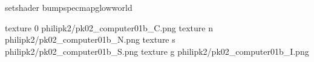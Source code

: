 setshader bumpspecmapglowworld


texture 0 philipk2/pk02_computer01b_C.png
texture n philipk2/pk02_computer01b_N.png
texture s philipk2/pk02_computer01b_S.png
texture g philipk2/pk02_computer01b_I.png

